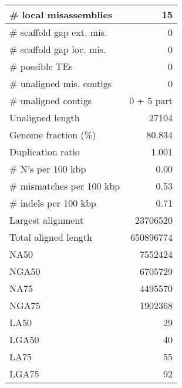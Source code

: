 \documentclass[12pt,a4paper]{article}
\begin{document}
\begin{table}[ht]
\begin{center}
\begin{tabular}{|l*{1}{|r}|}
\# local misassemblies & 15 \\ \hline
\# scaffold gap ext. mis. & 0 \\ \hline
\# scaffold gap loc. mis. & 0 \\ \hline
\# possible TEs & 0 \\ \hline
\# unaligned mis. contigs & 0 \\ \hline
\# unaligned contigs & 0 + 5 part \\ \hline
Unaligned length & 27104 \\ \hline
Genome fraction (\%) & 80.834 \\ \hline
Duplication ratio & 1.001 \\ \hline
\# N's per 100 kbp & 0.00 \\ \hline
\# mismatches per 100 kbp & 0.53 \\ \hline
\# indels per 100 kbp & 0.71 \\ \hline
Largest alignment & 23706520 \\ \hline
Total aligned length & 650896774 \\ \hline
NA50 & 7552424 \\ \hline
NGA50 & 6705729 \\ \hline
NA75 & 4495570 \\ \hline
NGA75 & 1902368 \\ \hline
LA50 & 29 \\ \hline
LGA50 & 40 \\ \hline
LA75 & 55 \\ \hline
LGA75 & 92 \\ \hline
\end{tabular}
\end{center}
\end{table}
\end{document}
